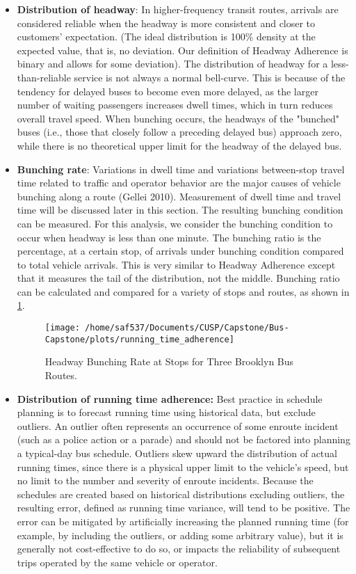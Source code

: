 \documentclass[12pt]{report}
\begin{document}
\begin{itemize}
\item \textbf{Distribution of headway}: In higher-frequency transit routes, arrivals are considered reliable when the headway is more consistent and closer to customers' expectation.  (The ideal distribution is 100\% density at the expected value, that is, no deviation.  Our definition of Headway Adherence is binary and allows for some deviation).  The distribution of headway for a less-than-reliable service is not always a normal bell-curve.  This is because of the tendency for delayed buses to become even more delayed, as the larger number of waiting passengers increases dwell times, which in turn reduces overall travel speed.  When bunching occurs, the headways of the "bunched" buses (i.e., those that closely follow a preceding delayed bus) approach zero, while there is no theoretical upper limit for the headway of the delayed bus.
\item \textbf{Bunching rate}: Variations in dwell time and variations between-stop travel time related to traffic and operator behavior are the major causes of vehicle bunching along a route (Gellei 2010).  Measurement of dwell time and travel time will be discussed later in this section.  The resulting bunching condition can be measured.  For this analysis, we consider the bunching condition to occur when headway is less than one minute.  The bunching ratio is the percentage, at a certain stop, of arrivals under bunching condition compared to total vehicle arrivals.  This is very similar to Headway Adherence except that it measures the tail of the distribution, not the middle.  Bunching ratio can be calculated and compared for a variety of stops and routes, as shown in \ref{bunch}.


\begin{figure}[!ht]
  \caption{Headway Bunching Rate at Stops for Three Brooklyn Bus Routes.}
  \label{bunch}
  \centering
    \texttt{[image: /home/saf537/Documents/CUSP/Capstone/Bus-Capstone/plots/running\_time\_adherence]}
\end{figure}



\item \textbf{Distribution of running time adherence:} Best practice in schedule planning is to forecast running time using historical data, but exclude outliers.  An outlier often represents an occurrence of some enroute incident (such as a police action or a parade) and should not be factored into planning a typical-day bus schedule. Outliers skew upward the distribution of actual running times, since there is a physical upper limit to the vehicle's speed, but no limit to the number and severity of enroute incidents. Because the schedules are created based on historical distributions excluding outliers, the resulting error, defined as running time variance, will tend to be positive. The error can be mitigated by artificially increasing the planned running time (for example, by including the outliers, or adding some arbitrary value), but it is generally not cost-effective to do so, or impacts the reliability of subsequent trips operated by the same vehicle or operator. 



\end{itemize}
\end{document}

